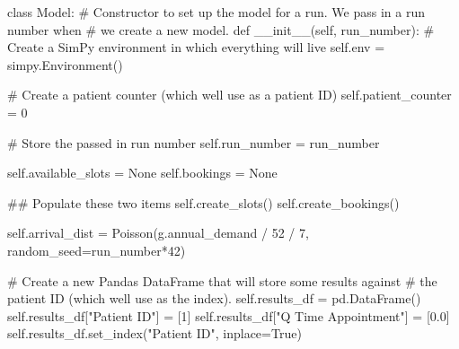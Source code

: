 \documentclass[
  letterpaper,
  DIV=11,
  numbers=noendperiod]{scrreprt}
\newenvironment{Shaded}{}{}
\newcommand{\CommentTok}[1]{\textcolor[rgb]{0.42,0.45,0.49}{#1}}
\newcommand{\DecValTok}[1]{\textcolor[rgb]{0.00,0.36,0.77}{#1}}
\newcommand{\FloatTok}[1]{\textcolor[rgb]{0.00,0.36,0.77}{#1}}
\newcommand{\FunctionTok}[1]{\textcolor[rgb]{0.44,0.26,0.76}{#1}}
\newcommand{\KeywordTok}[1]{\textcolor[rgb]{0.84,0.23,0.29}{#1}}
\newcommand{\NormalTok}[1]{\textcolor[rgb]{0.14,0.16,0.18}{#1}}
\newcommand{\OperatorTok}[1]{\textcolor[rgb]{0.14,0.16,0.18}{#1}}
\newcommand{\StringTok}[1]{\textcolor[rgb]{0.01,0.18,0.38}{#1}}
\newcommand{\VariableTok}[1]{\textcolor[rgb]{0.89,0.38,0.04}{#1}}
\newcommand*\circled[1]{\tikz[baseline=(char.base)]{
          \node[shape=circle,draw,inner sep=1pt] (char) {{\scriptsize#1}};}}
\begin{document}
\label{annotated-cell-202}%
\begin{Shaded}
\begin{Highlighting}[]
\KeywordTok{class}\NormalTok{ Model:}
    \CommentTok{\# Constructor to set up the model for a run.  We pass in a run number when}
    \CommentTok{\# we create a new model.}
    \KeywordTok{def} \FunctionTok{\_\_init\_\_}\NormalTok{(}\VariableTok{self}\NormalTok{, run\_number):}
        \CommentTok{\# Create a SimPy environment in which everything will live}
        \VariableTok{self}\NormalTok{.env }\OperatorTok{=}\NormalTok{ simpy.Environment()}

        \CommentTok{\# Create a patient counter (which we\textquotesingle{}ll use as a patient ID)}
        \VariableTok{self}\NormalTok{.patient\_counter }\OperatorTok{=} \DecValTok{0}

        \CommentTok{\# Store the passed in run number}
        \VariableTok{self}\NormalTok{.run\_number }\OperatorTok{=}\NormalTok{ run\_number}

        \VariableTok{self}\NormalTok{.available\_slots }\OperatorTok{=} \VariableTok{None}
        \VariableTok{self}\NormalTok{.bookings }\OperatorTok{=} \VariableTok{None}

        \CommentTok{\#\# Populate these two items}
        \VariableTok{self}\NormalTok{.create\_slots()}
        \VariableTok{self}\NormalTok{.create\_bookings()}

        \VariableTok{self}\NormalTok{.arrival\_dist }\OperatorTok{=}\NormalTok{ Poisson(g.annual\_demand }\OperatorTok{/} \DecValTok{52} \OperatorTok{/} \DecValTok{7}\NormalTok{, }\hspace*{\fill}\NormalTok{\circled{1}}
\NormalTok{                                    random\_seed}\OperatorTok{=}\NormalTok{run\_number}\OperatorTok{*}\DecValTok{42}\NormalTok{) }\hspace*{\fill}\NormalTok{\circled{2}}

        \CommentTok{\# Create a new Pandas DataFrame that will store some results against}
        \CommentTok{\# the patient ID (which we\textquotesingle{}ll use as the index).}
        \VariableTok{self}\NormalTok{.results\_df }\OperatorTok{=}\NormalTok{ pd.DataFrame()}
        \VariableTok{self}\NormalTok{.results\_df[}\StringTok{"Patient ID"}\NormalTok{] }\OperatorTok{=}\NormalTok{ [}\DecValTok{1}\NormalTok{]}
        \VariableTok{self}\NormalTok{.results\_df[}\StringTok{"Q Time Appointment"}\NormalTok{] }\OperatorTok{=}\NormalTok{ [}\FloatTok{0.0}\NormalTok{]}
        \VariableTok{self}\NormalTok{.results\_df.set\_index(}\StringTok{"Patient ID"}\NormalTok{, inplace}\OperatorTok{=}\VariableTok{True}\NormalTok{)}


\end{Highlighting}
\end{Shaded}
\end{document}
